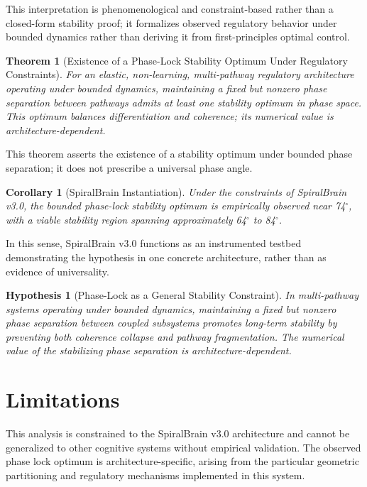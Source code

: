 \documentclass[12pt,a4paper]{article}
\newtheorem{theorem}{Theorem}
\newtheorem{corollary}{Corollary}
\newtheorem{hypothesis}{Hypothesis}
\begin{document}
This interpretation is phenomenological and constraint-based rather than a closed-form stability proof; it formalizes observed regulatory behavior under bounded dynamics rather than deriving it from first-principles optimal control.

\begin{theorem}[Existence of a Phase-Lock Stability Optimum Under Regulatory Constraints]
For an elastic, non-learning, multi-pathway regulatory architecture operating under bounded dynamics, maintaining a fixed but nonzero phase separation between pathways admits at least one stability optimum in phase space. This optimum balances differentiation and coherence; its numerical value is architecture-dependent.
\end{theorem}

This theorem asserts the existence of a stability optimum under bounded phase separation; it does not prescribe a universal phase angle.

\begin{corollary}[SpiralBrain Instantiation]
Under the constraints of SpiralBrain v3.0, the bounded phase-lock stability optimum is empirically observed near 74$^\circ$, with a viable stability region spanning approximately 64$^\circ$ to 84$^\circ$.
\end{corollary}

In this sense, SpiralBrain v3.0 functions as an instrumented testbed demonstrating the hypothesis in one concrete architecture, rather than as evidence of universality.

\begin{hypothesis}[Phase-Lock as a General Stability Constraint]
In multi-pathway systems operating under bounded dynamics, maintaining a fixed but
nonzero phase separation between coupled subsystems promotes long-term stability by
preventing both coherence collapse and pathway fragmentation. The numerical value of
the stabilizing phase separation is architecture-dependent.
\end{hypothesis}

\section{Limitations}

This analysis is constrained to the SpiralBrain v3.0 architecture and cannot be generalized to other cognitive systems without empirical validation. The observed phase lock optimum is architecture-specific, arising from the particular geometric partitioning and regulatory mechanisms implemented in this system.
\end{document}
